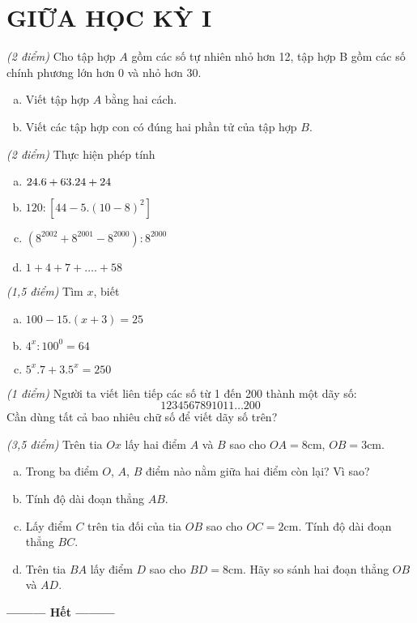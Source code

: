 \section{GIỮA HỌC KỲ I}
\setcounter{ex}{0}
\begin{ex}  \textit{(2 điểm)} Cho tập hợp $A$ gồm các số tự nhiên nhỏ hơn 12, tập hợp B gồm các số chính phương lớn hơn 0 và nhỏ hơn 30.
\begin{enumerate} [a)]
\item Viết tập hợp $A$ bằng hai cách.
\item Viết các tập hợp con có đúng hai phần tử của tập hợp $B$.
\end{enumerate}
\end{ex}    \begin{ex}  \textit{(2 điểm)} Thực hiện phép tính
 \begin{enumerate} [a)]
 \item $24.6 + 63.24{\rm{ }} + {\rm{ }}24$
 \item $120:\left[ {44 - 5.{{\left( {10 - 8} \right)}^2}} \right]$
 \item $\left( {{8^{2002}} + {8^{2001}} - {8^{2000}}} \right):{8^{2000}}$
 \item $1 + 4 + 7 + ….+ 58$
 \end{enumerate}
\noindent 
\end{ex}    \begin{ex}  \textit{(1,5 điểm)} Tìm $x$, biết
\begin{multicols}{2}
\begin{enumerate} [a)]
\item $100 - 15.\left( {x + 3} \right) = 25$
\item ${4^x}:{100^0} = 64$
\item ${5^x}.7 + {3.5^x} = 250$
\end{enumerate} 
\end{multicols}
\noindent
\end{ex}    \begin{ex}  \textit{(1 điểm)}
Người ta viết liên tiếp các số từ 1 đến 200 thành một dãy số: 
\[1234567891011 …200\]
Cần dùng tất cả bao nhiêu chữ số để viết dãy số trên?\\
\end{ex}    \begin{ex} \textit{(3,5 điểm)}
Trên tia $Ox$ lấy hai điểm $A$ và $B$ sao cho $OA = 8$cm, $OB = 3$cm.
\begin{enumerate} [a)]
\item Trong ba điểm $O$, $A$, $B$ điểm nào nằm giữa hai điểm còn  lại? Vì sao?
\item Tính độ dài đoạn thẳng $AB$.
\item Lấy điểm $C$ trên tia đối của tia $OB$ sao cho $OC = 2$cm. Tính độ dài đoạn thẳng $BC$.
\item Trên tia $BA$ lấy điểm $D$ sao cho $BD = 8$cm. Hãy so sánh hai đoạn thẳng $OB$ và $AD$.
\end{enumerate}
\end{ex}
\begin{center}
\textbf{\textbf{---------} Hết \textbf{---------}}
\end{center}